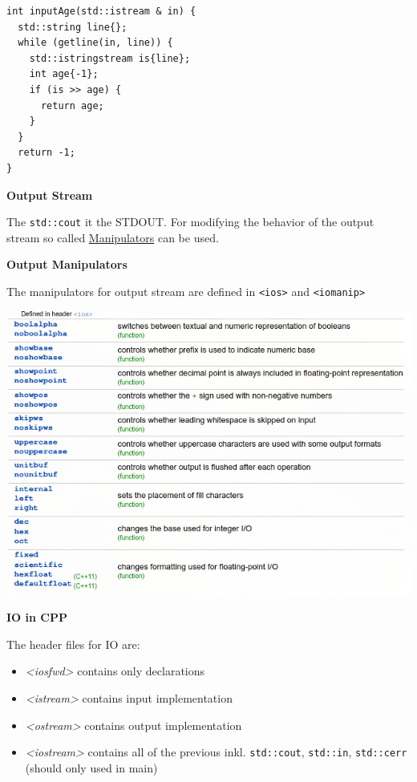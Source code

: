 \documentclass[11pt,twoside,landscape]{article}
\begin{document}
\begin{multicols}{3}
\lstset{language=c++,label= ,caption= ,captionpos=b,numbers=none}
\begin{lstlisting}
int inputAge(std::istream & in) {
  std::string line{};
  while (getline(in, line)) {
    std::istringstream is{line};
    int age{-1};
    if (is >> age) {
      return age;
    }
  }
  return -1;
}
\end{lstlisting}

\textbf{Output Stream}

The \texttt{std::cout} it the STDOUT.
For modifying the behavior of the output stream so called \href{../../../roam/20211008115905-manipulators_in_cpp.org}{Manipulators} can be used.

\textbf{Output Manipulators}

The manipulators for output stream are defined in \texttt{<ios>} and \texttt{<iomanip>}

{
\begin{center}
\includegraphics[width=.9\linewidth]{img/manipulator.png}
\end{center}
}

\textbf{IO in CPP}

The header files for IO are:
\begin{itemize}
\item \emph{<iosfwd>} contains only declarations
\item \emph{<istream>} contains input implementation
\item \emph{<ostream>} contains output implementation
\item \emph{<iostream>} contains all of the previous inkl. \texttt{std::cout}, \texttt{std::in}, \texttt{std::cerr} (should only used in main)
\end{itemize}



\end{multicols}
\end{document}
